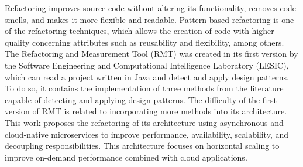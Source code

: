 \begin{Abstract}[english]%
Refactoring improves source code without altering its functionality, removes code smells, and makes it more flexible and readable. Pattern-based refactoring is one of the refactoring techniques, which allows the creation of code with higher quality concerning attributes such as reusability and flexibility, among others. The Refactoring and Measurement Tool (RMT) was created in its first version by the Software Engineering and Computational Intelligence Laboratory (LESIC), which can read a project written in Java and detect and apply design patterns. To do so, it contains the implementation of three methods from the literature capable of detecting and applying design patterns. The difficulty of the first version of RMT is related to incorporating more methods into its architecture. This work proposes the refactoring of its architecture using asynchronous and cloud-native microservices to improve performance, availability, scalability, and decoupling responsibilities. This architecture focuses on horizontal scaling to improve on-demand performance combined with cloud applications.
\end{Abstract}
